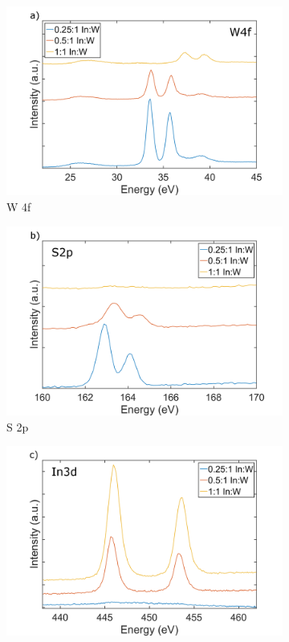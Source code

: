 \begin{figure}[!h]
	\begin{center}
		\begin{subfigure}[b]{1\textwidth}
			\includegraphics[scale=0.35]{In/XPSW4f.png}
			\caption{W 4f}
			\label{fig:InXPSW4f}
		\end{subfigure}
		\qquad
		\begin{subfigure}[b]{1\textwidth}
			\includegraphics[scale=0.35]{In/XPSS2p.png}
			\caption{S 2p}
			\label{fig:InXPSS2p}
		\end{subfigure}
		\begin{subfigure}[b]{1\textwidth}
			\includegraphics[scale=0.35]{In/XPSIn3d.png}

\end{subfigure}
\end{center}
\end{figure}
